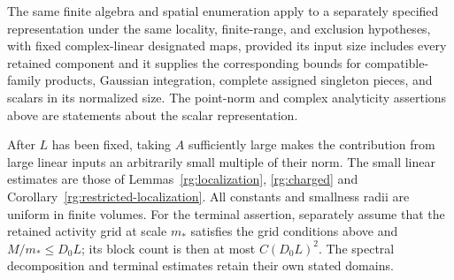 \begin{proposition}
The same finite algebra and spatial enumeration apply to a separately specified representation under the same locality, finite-range, and exclusion hypotheses, with fixed complex-linear designated maps, provided its input size includes every retained component and it supplies the corresponding bounds for compatible-family products, Gaussian integration, complete assigned singleton pieces, and scalars in its normalized size.  The point-norm and complex analyticity assertions above are statements about the scalar representation.

After $L$ has been fixed, taking $A$ sufficiently large makes the contribution from large linear inputs an arbitrarily small multiple of their norm.  The small linear estimates are those of Lemmas~\ref{rg:localization}, \ref{rg:charged} and Corollary~\ref{rg:restricted-localization}.  All constants and smallness radii are uniform in finite volumes.  For the terminal assertion, separately assume that the retained activity grid at scale $m_*$ satisfies the grid conditions above and $M/m_*\le D_0L$; its block count is then at most $C(D_0L)^2$.  The spectral decomposition and terminal estimates retain their own stated domains.
\end{proposition}

